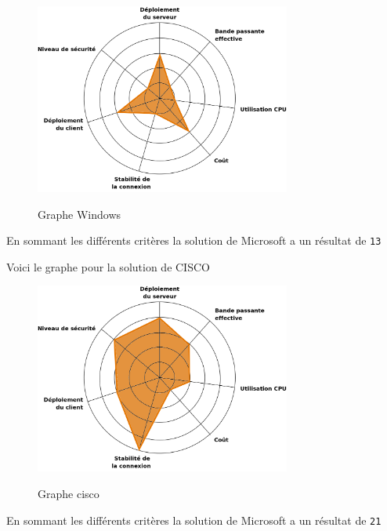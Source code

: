 \begin{figure}[H]
	\begin{center}
		\includegraphics[width=0.75\textwidth]{partie_3/images/windows.png}\\
	\end{center}
	\caption{Graphe Windows}
	\label{Graphe Windows}
\end{figure}

En sommant les différents critères la solution de Microsoft a un résultat de \verb|13|


Voici le graphe pour la solution de CISCO

\begin{figure}[H]
	\begin{center}
		\includegraphics[width=0.75\textwidth]{partie_3/images/cisco.png}\\
	\end{center}
	\caption{Graphe cisco}
	\label{Graphe cisco}
\end{figure}

En sommant les différents critères la solution de Microsoft a un résultat de \verb|21|

